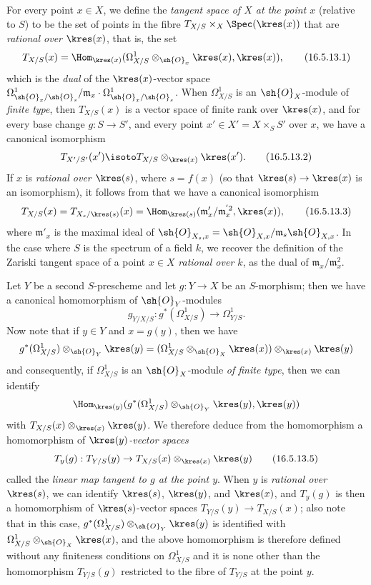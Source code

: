 \begin{env}[16.5.13]
\label{IV.16.5.13}
For every point $x \in X$, we define the \emph{tangent space of $X$ at the point $x$} (relative to $S$) to be the set of points in the fibre $T_{X/S} \times_X \Spec(\kres(x))$ that are \emph{rational over $\kres(x)$}, that is, the set
\[
\label{IV.16.5.13.1}
  T_{X/S}(x) = \Hom_{\kres(x)}(\Omega_{X/S}^1 \otimes_{\sh{O}_x} \kres(x), \kres(x)),
  \tag{16.5.13.1}
\]
which is the \emph{dual} of the $\kres(x)$-vector space $\Omega_{\sh{O}_x/\sh{O}_s}^1/\mathfrak{m}_x \cdot \Omega_{\sh{O}_x/\sh{O}_s}^1$.
When $\Omega_{X/S}^1$ is an $\sh{O}_X$-module of \emph{finite type}, then $T_{X/S}(x)$ is a vector space of finite rank over $\kres(x)$, and for every base change
$g : S \to S'$, and every point $x' \in X' = X \times_S S'$ over $x$, we have a canonical isomorphism
\[
  \label{IV.16.5.13.2}
  T_{X'/S'}(x') \isoto T_{X/S} \otimes_{\kres(x)} \kres(x').
  \tag{16.5.13.2}
\]
If $x$ is \emph{rational over $\kres(s)$}, where $s = f(x)$ (so that $\kres(s) \to \kres(x)$ is an isomorphism), it follows from  that we have a canonical isomorphism
\[
\label{IV.16.5.13.3}
  T_{X/S}(x) = T_{X_s/\kres(s)}(x) = \Hom_{\kres(s)}(\mathfrak{m}'_x/\mathfrak{m}_x^{'2}, \kres(x)),
  \tag{16.5.13.3}
\]
where $\mathfrak{m}'_x$ is the maximal ideal of $\sh{O}_{X_s,x} = \sh{O}_{X, x}/\mathfrak{m}_s \sh{O}_{X,x}$.
In the case where $S$ is the spectrum of a field $k$, we recover the definition of the Zariski tangent space of a point $x \in X$ \emph{rational over $k$}, as the dual of $\mathfrak{m}_x / \mathfrak{m}_x^2$.

Let $Y$ be a second $S$-prescheme and let $g : Y \to X$ be an $S$-morphism;
then we have a canonical homomorphism of $\sh{O}_Y$-modules 
\[
\label{IV.16.5.13.4}
  g_{Y/X/S} : g^*(\Omega_{X/S}^1) \to \Omega_{Y/S}^1.
  \tag{16.5.13.4}
\]
Now note that if $y \in Y$ and $x = g(y)$, then we have
\[
  g^*(\Omega_{X/S}^1) \otimes_{\sh{O}_Y} \kres(y) = (\Omega_{X/S}^1 \otimes_{\sh{O}_X} \kres(x)) \otimes_{\kres(x)} \kres(y) 
\]
and consequently, if $\Omega_{X/S}^1$ is an $\sh{O}_X$-module \emph{of finite type}, then we can identify
\[
  \Hom_{\kres(y)}(g^*(\Omega_{X/S}^1) \otimes_{\sh{O}_Y} \kres(y), \kres(y))
\]
with $T_{X/S}(x) \otimes_{\kres(x)} \kres(y)$.
We therefore deduce from the homomorphism  a homomorphism of \emph{$\kres(y)$-vector spaces}
\[
\label{IV.16.5.13.5}
  T_y(g) : T_{Y/S}(y) \to T_{X/S}(x) \otimes_{\kres(x)} \kres(y)
  \tag{16.5.13.5}
\]
called the \emph{linear map tangent to $g$ at the point $y$}.
When $y$ is \emph{rational over $\kres(s)$}, we can identify $\kres(s)$, $\kres(y)$, and $\kres(x)$, and $T_y(g)$ is then a homomorphism of $\kres(s)$-vector spaces $T_{Y/S}(y) \to T_{X/S}(x)$;
also note that in this case, $g^*(\Omega_{X/S}^1) \otimes_{\sh{O}_Y} \kres(y)$ is identified with $\Omega_{X/S}^1 \otimes_{\sh{O}_X} \kres(x)$, and the above homomorphism is therefore defined without any finiteness conditions on $\Omega_{X/S}^1$ and it is none other than the homomorphism $T_{Y/S}(g)$  restricted to the fibre of $T_{Y/S}$ at the point $y$.
\end{env}


